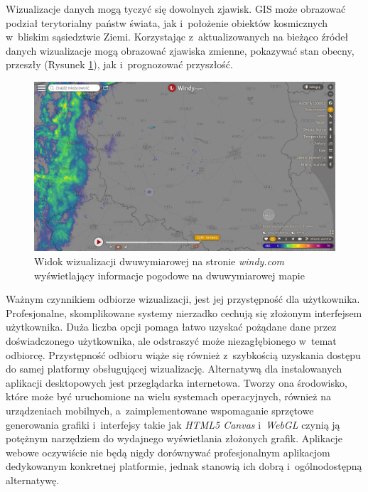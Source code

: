 Wizualizacje danych mogą tyczyć się dowolnych zjawisk. GIS może obrazować podział terytorialny państw świata, jak i~położenie obiektów kosmicznych w~bliskim sąsiedztwie Ziemi. Korzystając z~aktualizowanych na bieżąco źródeł danych wizualizacje mogą obrazować zjawiska zmienne, pokazywać stan obecny, przeszły (Rysunek \ref{fig:c1_windy}), jak i~prognozować przyszłość. 

\begin{figure}[h]
    \centering
    \includegraphics[width=\linewidth]{img/c1_windy.png}
    \caption{Widok wizualizacji dwuwymiarowej na stronie \textit{windy.com} wyświetlający informacje pogodowe na dwuwymiarowej mapie}
    \label{fig:c1_windy}
\end{figure}

Ważnym czynnikiem odbiorze wizualizacji, jest jej przystępność dla użytkownika. Profesjonalne, skomplikowane systemy nierzadko cechują się złożonym interfejsem użytkownika. Duża liczba opcji pomaga łatwo uzyskać pożądane dane przez doświadczonego użytkownika, ale odstraszyć może niezagłębionego w~temat odbiorcę. Przystępność odbioru wiąże się również z~szybkością uzyskania dostępu do samej platformy obsługującej wizualizację. Alternatywą dla instalowanych aplikacji desktopowych jest przeglądarka internetowa. Tworzy ona środowisko, które może być uruchomione na wielu systemach operacyjnych, również na urządzeniach mobilnych, a~zaimplementowane wspomaganie sprzętowe generowania grafiki i~interfejsy takie jak \textit{HTML5 Canvas}\cite{Canvas} i~\textit{WebGL}\cite{WebGL} czynią ją potężnym narzędziem do wydajnego wyświetlania złożonych grafik. 
Aplikacje webowe oczywiście nie będą nigdy dorównywać profesjonalnym aplikacjom dedykowanym konkretnej platformie, jednak stanowią ich dobrą i~ogólnodostępną alternatywę.


